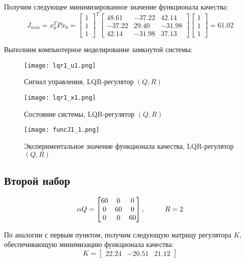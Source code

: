 Получим следующее минимизированное значение функционала качества:
$$
   J_{min} = x_0^T P x_0 = \begin{bmatrix}
    1\\1\\1
   \end{bmatrix}^T \begin{bmatrix}
      
   48.61 &  -37.22 &  42.14 \\
  -37.22 &  29.40 & -31.98 \\
   42.14 & -31.98  & 37.13
   \end{bmatrix}
   \begin{bmatrix}
    1\\1\\1
   \end{bmatrix} = 61.02
$$

Выполним компьютерное моделирование замкнутой системы:

\begin{figure}[ht]
  \centering
  \texttt{[image: lqr1\_u1.png]}
  \caption{Сигнал управления, LQR-регулятор $(Q, R)$}
\end{figure}
\newpage
\begin{figure}[ht]
  \centering
  \texttt{[image: lqr1\_x1.png]}
  \caption{Состояние системы, LQR-регулятор $(Q, R)$}
\end{figure}
\begin{figure}[ht]
  \centering
  \texttt{[image: funcJ1\_1.png]}
  \caption{Экспериментальное значение функционала качества, LQR-регулятор $(Q, R)$}
\end{figure}


\newpage
\subsection{Второй набор}
$$
  \alpha Q = \begin{bmatrix}
                        60 & 0 & 0 \\
                        0 & 60 & 0 \\
                        0 & 0 & 60 
                      \end{bmatrix}, \hspace*{1cm} R=2
$$

По аналогии с первым пунктом, получим следующую матрицу регулятора $K$, обеспечивающую минимизацию функционала качества:
$$
   K = \begin{bmatrix} 22.24 & -20.51 &  21.12 \end{bmatrix}
$$

